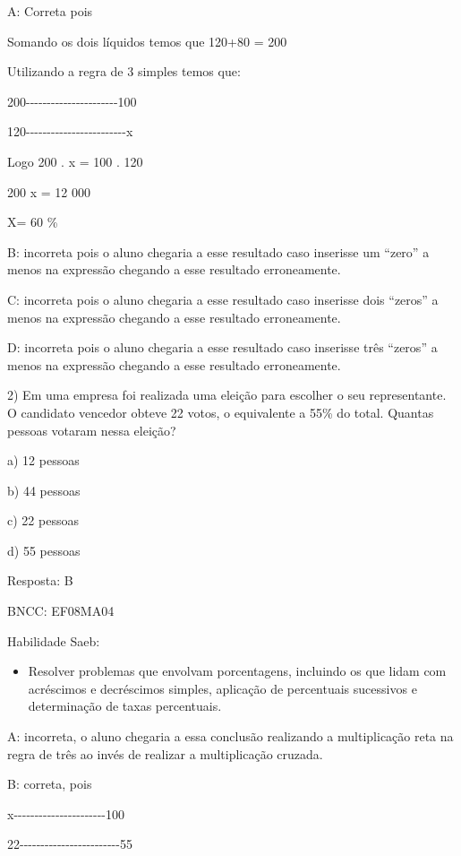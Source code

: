 {A: Correta pois

Somando os dois líquidos temos que 120+80 = 200

Utilizando a regra de 3 simples temos que:

200-\/-\/-\/-\/-\/-\/-\/-\/-\/-\/-\/-\/-\/-\/-\/-\/-\/-\/-\/-\/-\/-100

120-\/-\/-\/-\/-\/-\/-\/-\/-\/-\/-\/-\/-\/-\/-\/-\/-\/-\/-\/-\/-\/-\/-\/-x

Logo 200 . x = 100 . 120

200 x = 12 000

X= 60 \%

B: incorreta pois o aluno chegaria a esse resultado caso inserisse um
``zero'' a menos na expressão chegando a esse resultado erroneamente.

C: incorreta pois o aluno chegaria a esse resultado caso inserisse dois
``zeros'' a menos na expressão chegando a esse resultado erroneamente.

D: incorreta pois o aluno chegaria a esse resultado caso inserisse três
``zeros'' a menos na expressão chegando a esse resultado erroneamente.

2) Em uma empresa foi realizada uma eleição para escolher o seu
representante. O candidato vencedor obteve 22 votos, o equivalente a
55\% do total. Quantas pessoas votaram nessa eleição?

a) 12 pessoas

b) 44 pessoas

c) 22 pessoas

d) 55 pessoas

Resposta: B

BNCC: EF08MA04

Habilidade Saeb:

\begin{itemize}
\tightlist
\item
  Resolver problemas que envolvam porcentagens, incluindo os que lidam
  com acréscimos e decréscimos simples, aplicação de percentuais
  sucessivos e determinação de taxas percentuais.
\end{itemize}

A: incorreta, o aluno chegaria a essa conclusão realizando a
multiplicação reta na regra de três ao invés de realizar a multiplicação
cruzada.

B: correta, pois

x-\/-\/-\/-\/-\/-\/-\/-\/-\/-\/-\/-\/-\/-\/-\/-\/-\/-\/-\/-\/-\/-100

22-\/-\/-\/-\/-\/-\/-\/-\/-\/-\/-\/-\/-\/-\/-\/-\/-\/-\/-\/-\/-\/-\/-\/-55

}
